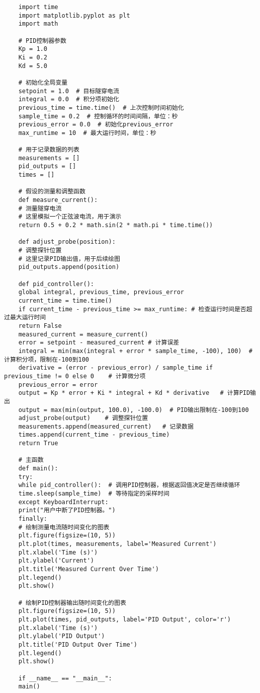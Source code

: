 \documentclass{article}
\begin{document}
\begin{lstlisting}
	import time
	import matplotlib.pyplot as plt
	import math
	
	# PID控制器参数
	Kp = 1.0
	Ki = 0.2
	Kd = 5.0
	
	# 初始化全局变量
	setpoint = 1.0  # 目标隧穿电流
	integral = 0.0  # 积分项初始化
	previous_time = time.time()  # 上次控制时间初始化
	sample_time = 0.2  # 控制循环的时间间隔，单位：秒
	previous_error = 0.0  # 初始化previous_error
	max_runtime = 10  # 最大运行时间，单位：秒
	
	# 用于记录数据的列表
	measurements = []
	pid_outputs = []
	times = []
	
	# 假设的测量和调整函数
	def measure_current():
	# 测量隧穿电流
	# 这里模拟一个正弦波电流，用于演示
	return 0.5 + 0.2 * math.sin(2 * math.pi * time.time())
	
	def adjust_probe(position):
	# 调整探针位置
	# 这里记录PID输出值，用于后续绘图
	pid_outputs.append(position)
	
	def pid_controller():
	global integral, previous_time, previous_error
	current_time = time.time()
	if current_time - previous_time >= max_runtime: # 检查运行时间是否超过最大运行时间
	return False
	measured_current = measure_current()
	error = setpoint - measured_current # 计算误差
	integral = min(max(integral + error * sample_time, -100), 100)  # 计算积分项，限制在-100到100
	derivative = (error - previous_error) / sample_time if previous_time != 0 else 0    # 计算微分项
	previous_error = error
	output = Kp * error + Ki * integral + Kd * derivative   # 计算PID输出
	output = max(min(output, 100.0), -100.0)  # PID输出限制在-100到100
	adjust_probe(output)    # 调整探针位置
	measurements.append(measured_current)   # 记录数据
	times.append(current_time - previous_time)
	return True
	
	# 主函数
	def main():
	try:
	while pid_controller():  # 调用PID控制器，根据返回值决定是否继续循环
	time.sleep(sample_time)  # 等待指定的采样时间
	except KeyboardInterrupt:
	print("用户中断了PID控制器。")
	finally:
	# 绘制测量电流随时间变化的图表
	plt.figure(figsize=(10, 5))
	plt.plot(times, measurements, label='Measured Current')
	plt.xlabel('Time (s)')
	plt.ylabel('Current')
	plt.title('Measured Current Over Time')
	plt.legend()
	plt.show()
	
	# 绘制PID控制器输出随时间变化的图表
	plt.figure(figsize=(10, 5))
	plt.plot(times, pid_outputs, label='PID Output', color='r')
	plt.xlabel('Time (s)')
	plt.ylabel('PID Output')
	plt.title('PID Output Over Time')
	plt.legend()
	plt.show()
	
	if __name__ == "__main__":
	main()
\end{lstlisting}
\end{document}
